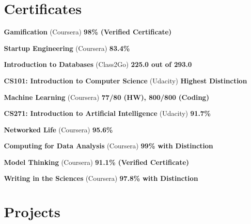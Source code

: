 \documentclass[margin,line]{resume}
\begin{document}
\begin{resume}
    \section{\mysidestyle Certificates}

    \begin{list2}
    \item \textbf{Gamification} (Coursera) \hspace{74mm} \textbf{98\% (Verified Certificate)}
    
	\item \textbf{Startup Engineering} (Coursera) \hspace{94mm} \textbf{83.4\%}

	\item \textbf{Introduction to Databases} (Class2Go) \hspace{64mm} \textbf{225.0 out of 293.0}

	\item \textbf{CS101: Introduction to Computer Science} (Udacity) \hspace{34mm} \textbf{Highest Distinction}

	\item \textbf{Machine Learning} (Coursera) \hspace{54mm} \textbf{77/80 (HW), 800/800 (Coding)}

	\item \textbf{CS271: Introduction to Artificial Intelligence} (Udacity) \hspace{52mm} \textbf{91.7\%}

	\item \textbf{Networked Life} (Coursera) \hspace{104mm} \textbf{95.6\%}

	\item \textbf{Computing for Data Analysis} (Coursera) \hspace{52mm} \textbf{99\% with Distinction}

    \item \textbf{Model Thinking} (Coursera) \hspace{65mm} \textbf{91.1\% (Verified Certificate)}

	\item \textbf{Writing in the Sciences} (Coursera) \hspace{60mm} \textbf{97.8\% with Distinction}
	\end{list2}

    \section{\mysidestyle Projects} 
	\begin{list2}


\end{list2}
\end{resume}
\end{document}
